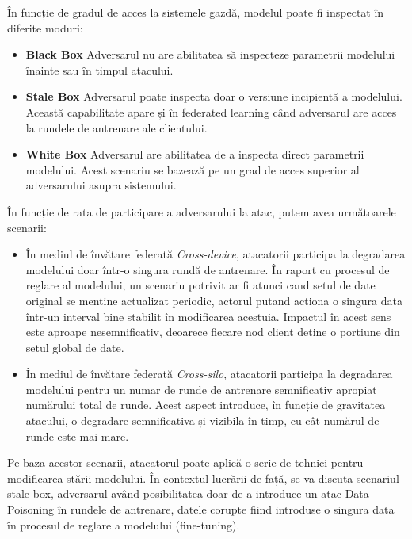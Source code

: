 \documentclass[../../main.tex]{subfiles}
\begin{document}
	    În funcție de gradul de acces la sistemele gazdă, modelul poate fi inspectat în diferite moduri:

    \begin{itemize}
        \item \textbf{Black Box}
	        Adversarul nu are abilitatea să inspecteze parametrii modelului înainte sau în timpul atacului.
        \item \textbf{Stale Box}
	        Adversarul poate inspecta doar o versiune incipientă a modelului. Această capabilitate apare și în federated learning când adversarul are acces la rundele de antrenare ale clientului.
        \item \textbf{White Box}
        Adversarul are abilitatea de a inspecta direct parametrii modelului. Acest scenariu se bazează pe un grad de acces superior al adversarului asupra sistemului.
    \end{itemize}

    În funcție de rata de participare a adversarului la atac, putem avea următoarele scenarii:

    \begin{itemize}
        \item În mediul de învățare federată \textit{Cross-device}, atacatorii participa la degradarea modelului doar într-o singura rundă de antrenare. În raport cu procesul de reglare al modelului, un scenariu potrivit ar fi atunci cand setul de date original se mentine actualizat periodic, actorul putand actiona o singura data într-un interval bine stabilit în modificarea acestuia. Impactul în acest sens este aproape nesemnificativ, deoarece fiecare nod client detine o portiune din setul global de date. 
        \item În mediul de învățare federată \textit{Cross-silo}, atacatorii participa la degradarea modelului pentru un numar de runde de antrenare semnificativ apropiat numărului total de runde. Acest aspect introduce, în funcție de gravitatea atacului, o degradare semnificativa și vizibila în timp, cu cât numărul de runde este mai mare. 
    \end{itemize}

    Pe baza acestor scenarii, atacatorul poate aplică o serie de tehnici pentru modificarea stării modelului. În contextul lucrării de față, se va discuta scenariul stale box, adversarul având
    posibilitatea doar de a introduce un atac Data Poisoning în rundele de antrenare, datele corupte fiind introduse o singura data în procesul de reglare a modelului (fine-tuning).
    
\end{document}
